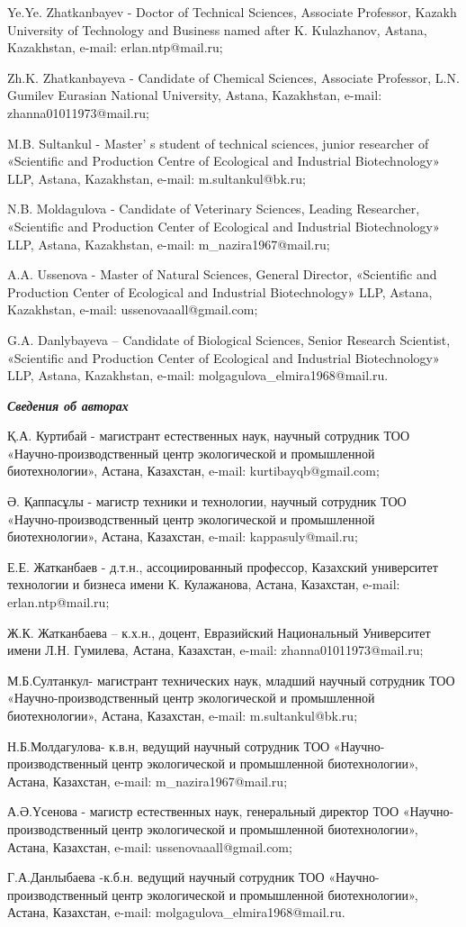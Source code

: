 Ye.Ye. Zhatkanbayev - Doctor of Technical Sciences, Associate Professor,
Kazakh University of Technology and Business named after K. Kulazhanov,
Astana, Kazakhstan, e-mail: erlan.ntp@mail.ru;

Zh.K. Zhatkanbayeva - Candidate of Chemical Sciences, Associate
Professor, L.N. Gumilev Eurasian National University, Astana,
Kazakhstan, e-mail: zhanna01011973@mail.ru;

M.B. Sultankul - Master' s student of technical sciences,
junior researcher of «Scientific and Production Centre of Ecological and
Industrial Biotechnology» LLP, Astana, Kazakhstan, e-mail:
m.sultankul@bk.ru;

N.B. Moldagulova - Candidate of Veterinary Sciences, Leading Researcher,
«Scientific and Production Center of Ecological and Industrial
Biotechnology» LLP, Astana, Kazakhstan, e-mail: m\_nazira1967@mail.ru;

A.A. Ussenova - Master of Natural Sciences, General Director,
«Scientific and Production Center of Ecological and Industrial
Biotechnology» LLP, Astana, Kazakhstan, e-mail: ussenovaaall@gmail.com;

G.A. Danlybayeva -- Candidate of Biological Sciences, Senior Research
Scientist, «Scientific and Production Center of Ecological and
Industrial Biotechnology» LLP, Astana, Kazakhstan, e-mail:
molgagulova\_elmira1968@mail.ru.

\emph{{\bfseries Сведения об авторах}}

Қ.А. Куртибай - магистрант естественных наук, научный сотрудник ТОО
«Научно-производственный центр экологической и промышленной
биотехнологии», Астана, Казахстан, e-mail: kurtibayqb@gmail.com;

Ә. Қаппасұлы - магистр техники и технологии, научный сотрудник ТОО
«Научно-производственный центр экологической и промышленной
биотехнологии», Астана, Казахстан, e-mail: kappasuly@mail.ru;

Е.Е. Жатканбаев - д.т.н., ассоциированный профессор, Казахский
университет технологии и бизнеса имени К. Кулажанова, Астана, Казахстан,
e-mail: erlan.ntp@mail.ru;

Ж.К. Жатканбаева -- к.х.н., доцент, Евразийский Национальный Университет
имени Л.Н. Гумилева, Астана, Казахстан, e-mail: zhanna01011973@mail.ru;

М.Б.Султанкул- магистрант технических наук, младший научный сотрудник
ТОО «Научно-производственный центр экологической и промышленной
биотехнологии», Астана, Казахстан, e-mail: m.sultankul@bk.ru;

Н.Б.Молдагулова- к.в.н, ведущий научный сотрудник ТОО
«Научно-производственный центр экологической и промышленной
биотехнологии», Астана, Казахстан, e-mail: m\_nazira1967@mail.ru;

А.Ә.Үсенова - магистр естественных наук, генеральный директор ТОО
«Научно-производственный центр экологической и промышленной
биотехнологии», Астана, Казахстан, e-mail: ussenovaaall@gmail.com;

Г.А.Данлыбаева -к.б.н. ведущий научный сотрудник ТОО
«Научно-производственный центр экологической и промышленной
биотехнологии», Астана, Казахстан, e-mail:
molgagulova\_elmira1968@mail.ru.